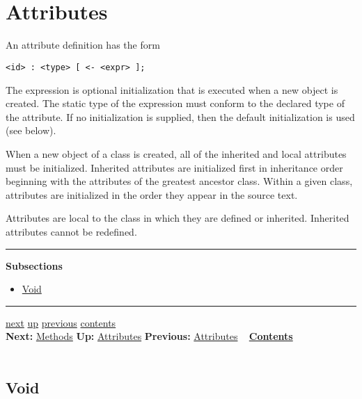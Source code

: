 \documentclass[]{article}
\begin{document}
\section{\\ Attributes}

An attribute definition has the form

\begin{verbatim}
<id> : <type> [ <- <expr> ];
\end{verbatim}

The expression is optional initialization that is executed when a new
object is created. The static type of the expression must conform to the
declared type of the attribute. If no initialization is supplied, then
the default initialization is used (see below).

When a new object of a class is created, all of the inherited and local
attributes must be initialized. Inherited attributes are initialized
first in inheritance order beginning with the attributes of the greatest
ancestor class. Within a given class, attributes are initialized in the
order they appear in the source text.

Attributes are local to the class in which they are defined or
inherited. Inherited attributes cannot be redefined.

\begin{center}\rule{3in}{0.4pt}\end{center}

\textbf{Subsections}

\begin{itemize}
\itemsep1pt\parskip0pt
\item
  \href{node11.html}{Void}
\end{itemize}

\begin{center}\rule{3in}{0.4pt}\end{center}

\href{node12.html}{next} \href{node10.html}{up}
\href{node10.html}{previous} \href{node1.html}{contents} \\
\textbf{Next:} \href{node12.html}{Methods} \textbf{Up:}
\href{node10.html}{Attributes} \textbf{Previous:}
\href{node10.html}{Attributes} ~ \textbf{\href{node1.html}{Contents}} \\
\\

\subsection{Void}
\end{document}
